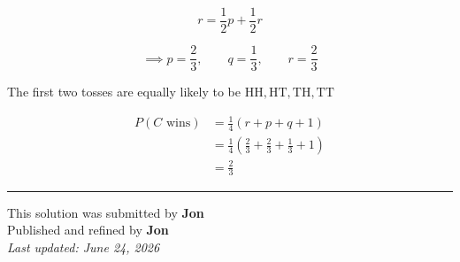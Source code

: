 \documentclass[12pt]{article}
\begin{document}
$$r=\frac12p+\frac12r$$

$$\implies p=\frac23,\qquad q=\frac13,\qquad r=\frac23$$

The first two tosses are equally likely to be $\mathrm{HH},\mathrm{HT},\mathrm{TH},\mathrm{TT}$

\begin{align*}
P(C\text{ wins})
&=\frac14(r+p+q+1)\\
&=\frac14\left(\frac23+\frac23+\frac13+1\right)\\
&=\boxed{\frac23}
\end{align*}


\bigskip
\hrule
\begin{center}
    This solution was submitted by \textbf{Jon}\\[4pt]
    Published and refined by \textbf{Jon}\\[8pt]
    \textit{Last updated: June 24, 2026}
\end{center}
\end{document}

